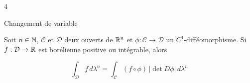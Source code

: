 
\begin{reponse}{4}

\begin{theoreme*}{Changement de variable}{}

Soit $n \in \mathbb{N}$, $\mathcal C$ et $\mathcal D$ deux ouverts de $\mathbb{R}^n$ et
$\phi : \mathcal C \to \mathcal D$ un $C^1$-difféomorphisme.
Si $f : \mathcal D \to \mathbb{R}$ est borélienne positive ou intégrable, alors

\[
\int_{\mathcal D} f \, d\lambda^n =
\int_{\mathcal C} (f \circ \phi)\, \left|\det D\phi\right| \, d\lambda^n
\]

\end{theoreme*}

\end{reponse}